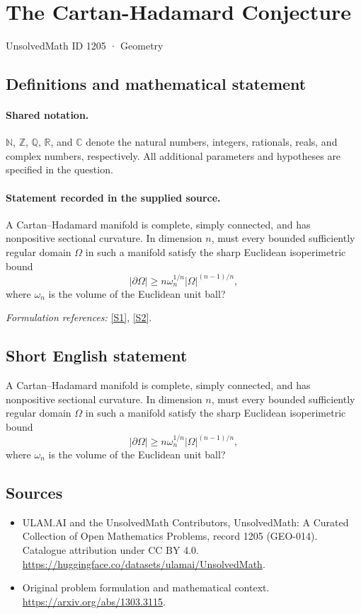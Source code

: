 \documentclass[11pt]{article}
\newcommand{\sref}[2]{\hyperlink{source:#1:#2}{[S#2]}}
\begin{document}
\setcounter{section}{1204}
\section{The Cartan-Hadamard Conjecture}\label{1205}
{\small UnsolvedMath ID 1205 · Geometry}
\subsection{Definitions and mathematical statement}

\paragraph{Shared notation.}$\mathbb N$, $\mathbb Z$, $\mathbb Q$, $\mathbb R$, and $\mathbb C$ denote the natural numbers, integers, rationals, reals, and complex numbers, respectively. All additional parameters and hypotheses are specified in the question.


\paragraph{Statement recorded in the supplied source.}
A Cartan--Hadamard manifold is complete, simply connected, and has nonpositive sectional curvature. In dimension $n$, must every bounded sufficiently regular domain $\Omega$ in such a manifold satisfy the sharp Euclidean isoperimetric bound
\[|\partial\Omega|\geq n\omega_n^{1/n}|\Omega|^{(n-1)/n},\]
where $\omega_n$ is the volume of the Euclidean unit ball?
\par\smallskip\textit{Formulation references:} \sref{1205}{1}, \sref{1205}{2}.
\subsection{Short English statement}
A Cartan--Hadamard manifold is complete, simply connected, and has nonpositive sectional curvature. In dimension $n$, must every bounded sufficiently regular domain $\Omega$ in such a manifold satisfy the sharp Euclidean isoperimetric bound
\[|\partial\Omega|\geq n\omega_n^{1/n}|\Omega|^{(n-1)/n},\]
where $\omega_n$ is the volume of the Euclidean unit ball?
\subsection{Sources}
\begin{itemize}
\item[\hypertarget{source:1205:1}{S1}] ULAM.AI and the UnsolvedMath Contributors, UnsolvedMath: A Curated Collection of Open Mathematics Problems, record 1205 (GEO-014). Catalogue attribution under CC BY 4.0.
\url{https://huggingface.co/datasets/ulamai/UnsolvedMath}.
\item[\hypertarget{source:1205:2}{S2}] Original problem formulation and mathematical context.
\url{https://arxiv.org/abs/1303.3115}.
\end{itemize}
\label{end:1205}
\end{document}
